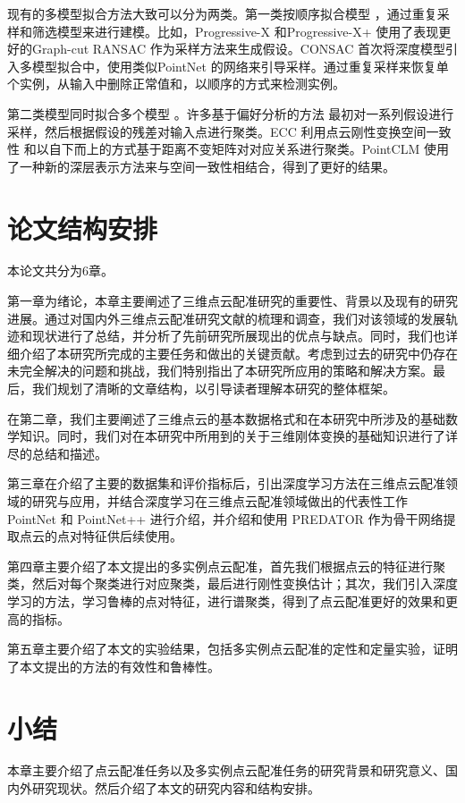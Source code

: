 现有的多模型拟合方法大致可以分为两类。第一类按顺序拟合模型 \cite{barath2019progressive,barath2021progressive,kanazawa2004detection,kluger2020consac} ，通过重复采样和筛选模型来进行建模。比如，Progressive-X \cite{barath2019progressive} 和Progressive-X+ \cite{barath2021progressive} 使用了表现更好的Graph-cut RANSAC \cite{barath2018graph} 作为采样方法来生成假设。CONSAC \cite{kluger2020consac} 首次将深度模型引入多模型拟合中，使用类似PointNet \cite{qi2017pointnet} 的网络来引导采样。通过重复采样来恢复单个实例，从输入中删除正常值和，以顺序的方式来检测实例。

第二类模型同时拟合多个模型 \cite{tang2022multi,toldo2008robust,magri2016multiple,magri2014t,magri2015robust} 。许多基于偏好分析的方法 \cite{toldo2008robust,magri2015robust} 最初对一系列假设进行采样，然后根据假设的残差对输入点进行聚类。ECC \cite{tang2022multi} 利用点云刚性变换空间一致性 \cite{leordeanu2005spectral} 和以自下而上的方式基于距离不变矩阵对对应关系进行聚类。PointCLM \cite{yuan2022pointclm} 使用了一种新的深层表示方法来与空间一致性相结合，得到了更好的结果。

\section{论文结构安排}
本论文共分为6章。

第一章为绪论，本章主要阐述了三维点云配准研究的重要性、背景以及现有的研究进展。通过对国内外三维点云配准研究文献的梳理和调查，我们对该领域的发展轨迹和现状进行了总结，并分析了先前研究所展现出的优点与缺点。同时，我们也详细介绍了本研究所完成的主要任务和做出的关键贡献。考虑到过去的研究中仍存在未完全解决的问题和挑战，我们特别指出了本研究所应用的策略和解决方案。最后，我们规划了清晰的文章结构，以引导读者理解本研究的整体框架。

在第二章，我们主要阐述了三维点云的基本数据格式和在本研究中所涉及的基础数学知识。同时，我们对在本研究中所用到的关于三维刚体变换的基础知识进行了详尽的总结和描述。

第三章在介绍了主要的数据集和评价指标后，引出深度学习方法在三维点云配准领域的研究与应用，并结合深度学习在三维点云配准领域做出的代表性工作 PointNet \cite{qi2017pointnet} 和 PointNet++ \cite{qi2017pointnet++} 进行介绍，并介绍和使用 PREDATOR \cite{huang2021predator} 作为骨干网络提取点云的点对特征供后续使用。

第四章主要介绍了本文提出的多实例点云配准，首先我们根据点云的特征进行聚类，然后对每个聚类进行对应聚类，最后进行刚性变换估计；其次，我们引入深度学习的方法，学习鲁棒的点对特征，进行谱聚类，得到了点云配准更好的效果和更高的指标。

第五章主要介绍了本文的实验结果，包括多实例点云配准的定性和定量实验，证明了本文提出的方法的有效性和鲁棒性。
\section{小结}
本章主要介绍了点云配准任务以及多实例点云配准任务的研究背景和研究意义、国内外研究现状。然后介绍了本文的研究内容和结构安排。
